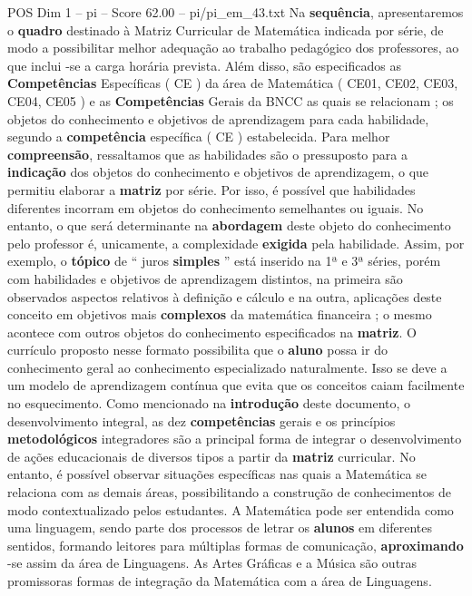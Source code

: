 \begin{textsample}{POS Dim 1 – pi – Score 62.00 – pi/pi\_em\_43.txt}
Na \textbf{sequência}, apresentaremos o \textbf{quadro} destinado à Matriz Curricular de Matemática indicada por série, de modo a possibilitar melhor adequação ao trabalho pedagógico dos professores, ao que inclui -se a carga horária prevista.
Além disso, são especificados as \textbf{Competências} Específicas ( CE ) da área de Matemática ( CE01, CE02, CE03, CE04, CE05 ) e as \textbf{Competências} Gerais da BNCC as quais se relacionam ; os objetos do conhecimento e objetivos de aprendizagem para cada habilidade, segundo a \textbf{competência} específica ( CE ) estabelecida.
Para melhor \textbf{compreensão}, ressaltamos que as habilidades são o pressuposto para a \textbf{indicação} dos objetos do conhecimento e objetivos de aprendizagem, o que permitiu elaborar a \textbf{matriz} por série.
Por isso, é possível que habilidades diferentes incorram em objetos do conhecimento semelhantes ou iguais.
No entanto, o que será determinante na \textbf{abordagem} deste objeto do conhecimento pelo professor é, unicamente, a complexidade \textbf{exigida} pela habilidade.
Assim, por exemplo, o \textbf{tópico} de “ juros \textbf{simples} ” está inserido na 1ª e 3ª séries, porém com habilidades e objetivos de aprendizagem distintos, na primeira são observados aspectos relativos à definição e cálculo e na outra, aplicações deste conceito em objetivos mais \textbf{complexos} da matemática financeira ; o mesmo acontece com outros objetos do conhecimento especificados na \textbf{matriz}.
O currículo proposto nesse formato possibilita que o \textbf{aluno} possa ir do conhecimento geral ao conhecimento especializado naturalmente.
Isso se deve a um modelo de aprendizagem contínua que evita que os conceitos caiam facilmente no esquecimento.
Como mencionado na \textbf{introdução} deste documento, o desenvolvimento integral, as dez \textbf{competências} gerais e os princípios \textbf{metodológicos} integradores são a principal forma de integrar o desenvolvimento de ações educacionais de diversos tipos a partir da \textbf{matriz} curricular.
No entanto, é possível observar situações específicas nas quais a Matemática se relaciona com as demais áreas, possibilitando a construção de conhecimentos de modo contextualizado pelos estudantes.
A Matemática pode ser entendida como uma linguagem, sendo parte dos processos de letrar os \textbf{alunos} em diferentes sentidos, formando leitores para múltiplas formas de comunicação, \textbf{aproximando} -se assim da área de Linguagens.
As Artes Gráficas e a Música são outras promissoras formas de integração da Matemática com a área de Linguagens.

\end{textsample}
